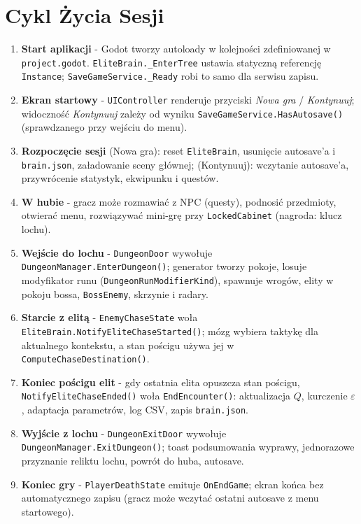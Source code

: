 \section{Cykl Życia Sesji}

\begin{enumerate}
    \item \textbf{Start aplikacji} - Godot tworzy autoloady w kolejności zdefiniowanej w \texttt{project.godot}. \texttt{EliteBrain.\allowbreak\_EnterTree} ustawia statyczną referencję \texttt{Instance}; \texttt{SaveGameService.\allowbreak\_Ready} robi to samo dla serwisu zapisu.
    \item \textbf{Ekran startowy} - \texttt{UIController} renderuje przyciski \textit{Nowa gra} / \textit{Kontynuuj}; widoczność \textit{Kontynuuj} zależy od wyniku \texttt{SaveGameService.HasAutosave()} (sprawdzanego przy wejściu do menu).
    \item \textbf{Rozpoczęcie sesji} (Nowa gra): reset \texttt{EliteBrain}, usunięcie autosave'a i \texttt{brain.json}, załadowanie sceny głównej; (Kontynuuj): wczytanie autosave'a, przywrócenie statystyk, ekwipunku i questów.
    \item \textbf{W hubie} - gracz może rozmawiać z NPC (questy), podnosić przedmioty, otwierać menu, rozwiązywać mini-grę przy \texttt{LockedCabinet} (nagroda: klucz lochu).
    \item \textbf{Wejście do lochu} - \texttt{DungeonDoor} wywołuje \texttt{DungeonManager.EnterDungeon()}; generator tworzy pokoje, losuje modyfikator runu (\texttt{DungeonRunModifierKind}), spawnuje wrogów, elity w pokoju bossa, \texttt{BossEnemy}, skrzynie i radary.
    \item \textbf{Starcie z elitą} - \texttt{EnemyChaseState} woła \texttt{EliteBrain.NotifyEliteChaseStarted()}; mózg wybiera taktykę dla aktualnego kontekstu, a stan pościgu używa jej w \texttt{ComputeChaseDestination()}.
    \item \textbf{Koniec pościgu elit} - gdy ostatnia elita opuszcza stan pościgu, \texttt{NotifyEliteChaseEnded()} woła \texttt{EndEncounter()}: aktualizacja $Q$, kurczenie $\varepsilon$, adaptacja parametrów, log CSV, zapis \texttt{brain.json}.
    \item \textbf{Wyjście z lochu} - \texttt{DungeonExitDoor} wywołuje \texttt{DungeonManager.ExitDungeon()}; toast podsumowania wyprawy, jednorazowe przyznanie reliktu lochu, powrót do huba, autosave.
    \item \textbf{Koniec gry} - \texttt{PlayerDeathState} emituje \texttt{OnEndGame}; ekran końca bez automatycznego zapisu (gracz może wczytać ostatni autosave z menu startowego).
\end{enumerate}

